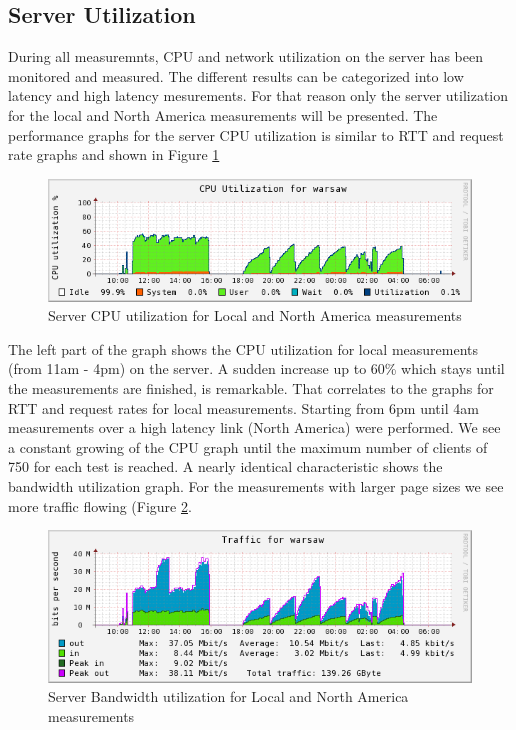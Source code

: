 \subsection{Server Utilization}
\label{subsec:server_util}

During all measuremnts, CPU and network utilization on the server has been monitored and measured. The different results can be categorized into low latency and high latency mesurements. For that reason only the server utilization for the local and North America measurements will be presented. The performance graphs for the server CPU utilization is similar to RTT and request rate graphs and shown in Figure \ref{fig:cpu}   

\begin{figure}[H]
\centering
\includegraphics[scale=0.6,trim=0.0cm .0cm .0cm .0cm,clip]{images/cpu.png}
\caption{Server CPU utilization for Local and North America measurements}
\label{fig:cpu}
\end{figure}

The left part of the graph shows the CPU utilization for local measurements (from 11am - 4pm) on the server. A sudden increase up to 60\% which stays until the measurements are finished, is remarkable. That correlates to the graphs for RTT and request rates for local measurements. Starting from 6pm until 4am measurements over a high latency link (North America) were performed. We see a constant growing of the CPU graph until the maximum number of clients of 750 for each test is reached. A nearly identical characteristic shows the bandwidth utilization graph. For the measurements with larger page sizes we see more traffic flowing (Figure \ref{fig:network}.

\begin{figure}[H]
\centering
\includegraphics[scale=0.6,trim=0.0cm .0cm .0cm .0cm,clip]{images/network.png}
\caption{Server Bandwidth utilization for Local and North America measurements}
\label{fig:network}
\end{figure}

